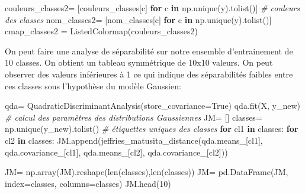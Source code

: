 \documentclass[
]{article}
\newenvironment{Shaded}{}{}
\newcommand{\BuiltInTok}[1]{\textcolor[rgb]{0.00,0.50,0.00}{#1}}
\newcommand{\CommentTok}[1]{\textcolor[rgb]{0.38,0.63,0.69}{\textit{#1}}}
\newcommand{\ControlFlowTok}[1]{\textcolor[rgb]{0.00,0.44,0.13}{\textbf{#1}}}
\newcommand{\DecValTok}[1]{\textcolor[rgb]{0.25,0.63,0.44}{#1}}
\newcommand{\KeywordTok}[1]{\textcolor[rgb]{0.00,0.44,0.13}{\textbf{#1}}}
\newcommand{\NormalTok}[1]{#1}
\newcommand{\OperatorTok}[1]{\textcolor[rgb]{0.40,0.40,0.40}{#1}}
\newcommand{\VariableTok}[1]{\textcolor[rgb]{0.10,0.09,0.49}{#1}}
\begin{document}
\begin{Shaded}
\begin{Highlighting}[]
\NormalTok{couleurs\_classes2}\OperatorTok{=}\NormalTok{ [couleurs\_classes[c] }\ControlFlowTok{for}\NormalTok{ c }\KeywordTok{in}\NormalTok{ np.unique(y).tolist()] }\CommentTok{\# couleurs des classes}
\NormalTok{nom\_classes2}\OperatorTok{=}\NormalTok{ [nom\_classes[c] }\ControlFlowTok{for}\NormalTok{ c }\KeywordTok{in}\NormalTok{ np.unique(y).tolist()]}
\NormalTok{cmap\_classes2 }\OperatorTok{=}\NormalTok{ ListedColormap(couleurs\_classes2)}
\end{Highlighting}
\end{Shaded}

On peut faire une analyse de séparabilité sur notre ensemble
d'entrainement de 10 classes. On obtient un tableau symmétrique de 10x10
valeurs. On peut observer des valeurs inférieures à 1 ce qui indique des
séparabilités faibles entre ces classes sous l'hypothèse du modèle
Gaussien:

\label{9717dbfb}
\label{cb15}
\begin{Shaded}
\begin{Highlighting}[]
\NormalTok{qda}\OperatorTok{=}\NormalTok{ QuadraticDiscriminantAnalysis(store\_covariance}\OperatorTok{=}\VariableTok{True}\NormalTok{)}
\NormalTok{qda.fit(X, y\_new) }\CommentTok{\# calcul des paramètres des distributions Gaussiennes}
\NormalTok{JM}\OperatorTok{=}\NormalTok{ []}
\NormalTok{classes}\OperatorTok{=}\NormalTok{ np.unique(y\_new).tolist() }\CommentTok{\# étiquettes uniques des classes}
\ControlFlowTok{for}\NormalTok{ cl1 }\KeywordTok{in}\NormalTok{ classes:}
  \ControlFlowTok{for}\NormalTok{ cl2 }\KeywordTok{in}\NormalTok{ classes:}
\NormalTok{    JM.append(jeffries\_matusita\_distance(qda.means\_[cl1], qda.covariance\_[cl1], qda.means\_[cl2], qda.covariance\_[cl2]))}

\NormalTok{JM}\OperatorTok{=}\NormalTok{ np.array(JM).reshape(}\BuiltInTok{len}\NormalTok{(classes),}\BuiltInTok{len}\NormalTok{(classes))}
\NormalTok{JM}\OperatorTok{=}\NormalTok{ pd.DataFrame(JM, index}\OperatorTok{=}\NormalTok{classes, columns}\OperatorTok{=}\NormalTok{classes)}
\NormalTok{JM.head(}\DecValTok{10}\NormalTok{)}
\end{Highlighting}
\end{Shaded}
\end{document}
